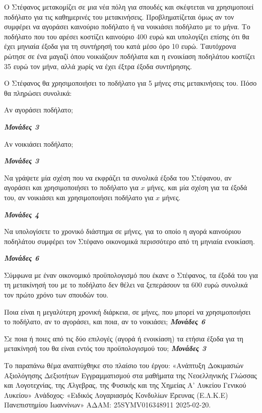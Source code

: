 \documentclass[11pt,a4paper,twoside]{book}
\newcommand{\monades}[1]{
\hspace*{\fill}
\textbf{\textit{\textcolor{maincolor}{Μονάδες #1}}}}
\begin{document}
Ο Στέφανος μετακομίζει σε μια νέα πόλη για σπουδές και σκέφτεται να χρησιμοποιεί ποδήλατο για τις καθημερινές του μετακινήσεις. Προβληματίζεται όμως αν τον συμφέρει να αγοράσει καινούριο ποδήλατο ή να νοικιάσει ποδήλατο με το μήνα. Το ποδήλατο που του αρέσει κοστίζει καινούριο 400 ευρώ και υπολογίζει επίσης ότι θα έχει μηνιαία έξοδα για τη συντήρησή του κατά μέσο όρο 10 ευρώ. Ταυτόχρονα ρώτησε σε ένα μαγαζί όπου νοικιάζουν ποδήλατα και η ενοικίαση ποδηλάτου κοστίζει 35 ευρώ τον μήνα, αλλά χωρίς να έχει έξτρα έξοδα συντήρησης.

\begin{alist}
\item Ο Στέφανος θα χρησιμοποιήσει το ποδήλατο για 5 μήνες στις μετακινήσεις του. Πόσο θα πληρώσει συνολικά:


\begin{rlist}
\item
  Αν αγοράσει ποδήλατο;
\monades{3}

\item
  Αν νοικιάσει ποδήλατο;
\monades{3}
\end{rlist}
\item Να γράψετε μία σχέση που να εκφράζει τα συνολικά έξοδα του Στέφανου, αν αγοράσει και χρησιμοποιήσει το ποδήλατο για $x$ μήνες, και μία σχέση για τα έξοδά του, αν νοικιάσει και χρησιμοποιήσει ποδήλατο για $x$ μήνες.
\monades{4}
\item Να υπολογίσετε το χρονικό διάστημα σε μήνες, για το οποίο η αγορά καινούριου ποδηλάτου συμφέρει τον Στέφανο οικονομικά περισσότερο από τη μηνιαία ενοικίαση.
\monades{6}
\item Σύμφωνα με έναν οικονομικό προϋπολογισμό που έκανε ο Στέφανος, τα έξοδά του για τη μετακίνησή του με το ποδήλατο δεν θέλει να ξεπεράσουν τα 600 ευρώ συνολικά τον πρώτο χρόνο των σπουδών του.
\begin{rlist}
\item
  Ποια είναι η μεγαλύτερη χρονική διάρκεια, σε μήνες, που μπορεί να χρησιμοποιήσει το ποδήλατο, αν το αγοράσει, και ποια, αν το νοικιάσει;\monades{6}
\item
  Σε ποια ή ποιες από τις δύο επιλογές (αγορά ή ενοικίαση) τα ετήσια έξοδα για τη μετακίνησή του θα είναι εντός του προϋπολογισμού του;\monades{3}

{\footnotesize Το παραπάνω θέμα αναπτύχθηκε στο πλαίσιο του έργου: «Ανάπτυξη Δοκιμασιών Αξιολόγησης Δεξιοτήτων Εγγραμματισμού στα μαθήματα της Νεοελληνικής Γλώσσας και Λογοτεχνίας, της Άλγεβρας, της Φυσικής και της Χημείας Α' Λυκείου Γενικού Λυκείου» Ανάδοχος: «Ειδικός Λογαριασμός Κονδυλίων Έρευνας (Ε.Λ.Κ.Ε) Πανεπιστημίου Ιωαννίνων» ΑΔΑΜ: 25SYMV016348911 2025-02-20.}
\end{rlist}
\end{alist}
\end{document}
